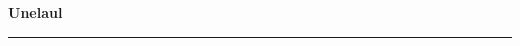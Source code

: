 \documentclass[10pt]{book}
\begin{document}
{
  \samepage
  \raggedbottom
  \raggedright
  \sloppy


  \vspace{0.2in}

  \noindent\begin{minipage}{.1\textwidth}
    \hfill\vspace{0.1in}
  \end{minipage}%
  \noindent\begin{minipage}{.8\textwidth}
    \centering
    \bfseries
    \large Unelaul
  \end{minipage}%
  \noindent\begin{minipage}{.1\textwidth}
      \hfill\vspace{0.1in}
  \end{minipage}

  \nopagebreak[4]
  \vspace{0.1in}
  \nopagebreak[4]
  \hrule height 0.05ex
  \nopagebreak[4]
  \vspace{-0.05in}




}
\end{document}
